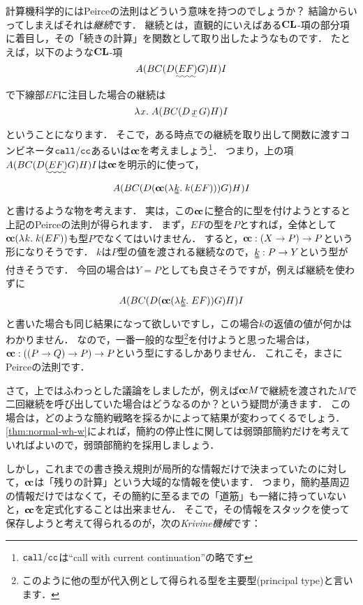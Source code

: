 \documentclass[realisability.tex]{subfiles}
\begin{document}
計算機科学的にはPeirceの法則はどういう意味を持つのでしょうか？
結論からいってしまえばそれは\emph{継続}です．
継続とは，直観的にいえばある$\mathord{\mathbf{CL}}$-項の部分項に着目し，その「続きの計算」を関数として取り出したようなものです．
たとえば，以下のような$\mathord{\mathbf{CL}}$-項
\[
 A(BC(D\uwave{(EF)}G)H)I
\]
で下線部$EF$に注目した場合の継続は
\[
 \abs{x}{A(BC(D\, \uwave{x} \,G)H)I}
\]
ということになります．
そこで，ある時点での継続を取り出して関数に渡すコンビネータ$\mathop{\mathtt{call/cc}}$あるいは$\mathsf{\mathbf{c\hspace{-1pt}c}}$を考えましょう\footnote{$\mathop{\mathtt{call/cc}}$は``call with current continuation''の略です}．
つまり，上の項$A(BC(D\uwave{(EF)}G)H)I$は$\mathsf{\mathbf{c\hspace{-1pt}c}}$を明示的に使って，
\[
 A(BC(D(\cc(\abs{\uuline{k}}{k (EF)}))G)H)I
\]
と書けるような物を考えます．
実は，この$\mathsf{\mathbf{c\hspace{-1pt}c}}$に整合的に型を付けようとすると上記のPeirceの法則が得られます．
まず，$EF$の型を$P$とすれば，全体として$\mathsf{\mathbf{c\hspace{-1pt}c}} (\lambda^{\mathsf{}}k.\;k (EF))$も型$P$でなくてはいけません．
すると，$\mathsf{\mathbf{c\hspace{-1pt}c}}: (X \to P) \to P$という形になりそうです．
$k$は$P$型の値を渡される継続なので，$\uuline{k}: P \to Y$という型が付きそうです．
今回の場合は$Y = P$としても良さそうですが，例えば継続を使わずに
\[
 A(BC(D(\cc(\abs{\uuline{k}}{EF}))G)H)I
\]
と書いた場合も同じ結果になって欲しいですし，この場合$k$の返値の値が何かはわかりません．
なので，一番一般的な型\footnote{このように他の型が代入例として得られる型を主要型(principal type)と言います．}を付けようと思った場合は，$\mathsf{\mathbf{c\hspace{-1pt}c}}: ((P \to Q) \to P) \to P$という型にするしかありません．
これこそ，まさにPeirceの法則です．

さて，上ではふわっとした議論をしましたが，例えば$\mathsf{\mathbf{c\hspace{-1pt}c}} M$で継続を渡された$M$で二回継続を呼び出していた場合はどうなるのか？という疑問が湧きます．
この場合は，どのような簡約戦略を採るかによって結果が変わってくるでしょう．
\cref{thm:normal-wh-w}によれば，簡約の停止性に関しては弱頭部簡約だけを考えていればよいので，弱頭部簡約を採用しましょう．

しかし，これまでの書き換え規則が局所的な情報だけで決まっていたのに対して，$\mathsf{\mathbf{c\hspace{-1pt}c}}$は「残りの計算」という大域的な情報を使います．
つまり，簡約基周辺の情報だけではなくて，その簡約に至るまでの「道筋」も一緒に持っていないと，$\mathsf{\mathbf{c\hspace{-1pt}c}}$を定式化することは出来ません．
そこで，その情報をスタックを使って保存しようと考えて得られるのが，次の\emph{Krivine機械}です：
\end{document}
